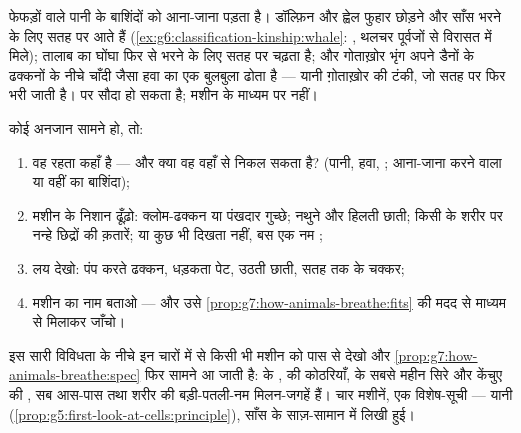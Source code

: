 \begin{example}[पानी में रहते हुए हवा में साँस लेना]\label{ex:g7:how-animals-breathe:airinwater}
फेफड़ों वाले पानी के बाशिंदों को आना-जाना पड़ता है। डॉल्फ़िन और ह्वेल
फुहार छोड़ने और साँस भरने के लिए सतह पर आते हैं
(\cref{ex:g6:classification-kinship:whale}:  , थलचर
पूर्वजों से विरासत में मिले); तालाब का घोंघा फिर से भरने के लिए सतह पर
चढ़ता है; और गोताख़ोर भृंग अपने डैनों के ढक्कनों के नीचे चाँदी जैसा हवा
का एक बुलबुला ढोता है --- यानी ग़ोताख़ोर की टंकी, जो सतह पर फिर भरी जाती
है।  पर सौदा हो सकता है; मशीन के माध्यम पर नहीं।
\end{example}

\begin{method}[किसी जंतु की साँस पढ़ना]\label{met:g7:how-animals-breathe:read}
कोई अनजान  सामने हो, तो:
\begin{enumerate}
  \item वह रहता कहाँ है --- और क्या वह वहाँ से निकल सकता है? (पानी,
        हवा, ; आना-जाना करने वाला या वहीं का बाशिंदा);
  \item मशीन के निशान ढूँढ़ो: क्लोम-ढक्कन या पंखदार गुच्छे; नथुने और
        हिलती छाती; किसी  के शरीर पर नन्हे छिद्रों की क़तारें; या
        कुछ भी दिखता नहीं, बस एक नम ;
  \item लय देखो: पंप करते ढक्कन, धड़कता पेट, उठती छाती, सतह तक के
        चक्कर;
  \item मशीन का नाम बताओ --- और उसे
        \cref{prop:g7:how-animals-breathe:fits} की मदद से माध्यम से
        मिलाकर जाँचो।
\end{enumerate}
\end{method}

\begin{remark}[विशेष-सूची कभी नहीं बदलती]\label{rem:g7:how-animals-breathe:same}
इस सारी विविधता के नीचे इन चारों में से किसी भी मशीन को पास से देखो और
\cref{prop:g7:how-animals-breathe:spec} फिर सामने आ जाती है:  के
,  की कोठरियाँ,  के सबसे महीन सिरे और केंचुए की
, सब आस-पास तथा शरीर की बड़ी-पतली-नम मिलन-जगहें हैं। चार मशीनें,
एक विशेष-सूची --- यानी 
(\cref{prop:g5:first-look-at-cells:principle}), साँस के साज़-सामान में
लिखी हुई।
\end{remark}

